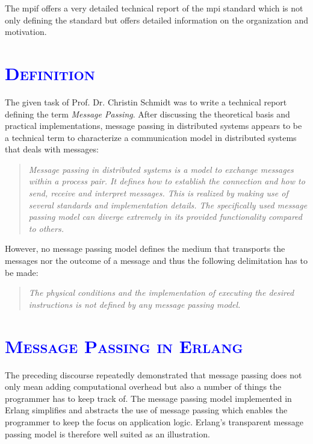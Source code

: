 \documentclass[xcolor=dvipsnames]{article}
\begin{document}
\noindent The \gls{mpif} offers a very detailed technical report \cite{mpi} of the \gls{mpi} standard which is not only defining the standard but offers detailed information on the organization and motivation.

\section{\scshape{\textcolor{blue}{Definition}}}

The given task of Prof. Dr. Christin Schmidt was to write a technical report defining the term \textit{Message Passing}. After discussing the theoretical basis and practical implementations, message passing in distributed systems appears to be a technical term to characterize a communication model in distributed systems that deals with messages:

\begin{quote}
\textit{Message passing in distributed systems is a model to exchange messages within a process pair. It defines how to establish the connection and how to send, receive and interpret messages. This is realized by making use of several standards and implementation details. The specifically used message passing model can diverge extremely in its provided functionality compared to others.}
\end{quote}

\noindent However, no message passing model defines the medium that transports the messages nor the outcome of a message and thus the following delimitation has to be made:

\begin{quote}
\textit{The physical conditions and the implementation of executing the desired instructions is not defined by any message passing model.}
\end{quote}

\section{\scshape{\textcolor{blue}{Message Passing in Erlang}}} \label{erlang}

The preceding discourse repeatedly demonstrated that message passing does not only mean adding computational overhead but also a number of things the programmer has to keep track of. The message passing model implemented in Erlang simplifies and abstracts the use of message passing which enables the programmer to keep the focus on application logic. Erlang's transparent message passing model is therefore well suited as an illustration.
\end{document}
